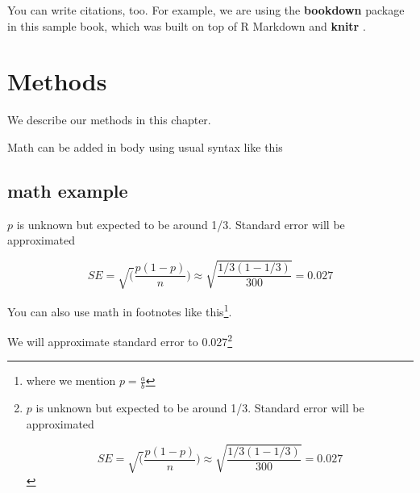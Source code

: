 \documentclass[
]{book}
\begin{document}
You can write citations, too. For example, we are using the \textbf{bookdown} package \citep{R-bookdown} in this sample book, which was built on top of R Markdown and \textbf{knitr} \citep{xie2015}.

\hypertarget{methods}{%
\chapter{Methods}\label{methods}}

We describe our methods in this chapter.

Math can be added in body using usual syntax like this

\hypertarget{math-example}{%
\section{math example}\label{math-example}}

\(p\) is unknown but expected to be around 1/3. Standard error will be approximated

\[
SE = \sqrt(\frac{p(1-p)}{n}) \approx \sqrt{\frac{1/3 (1 - 1/3)} {300}} = 0.027
\]

You can also use math in footnotes like this\footnote{where we mention \(p = \frac{a}{b}\)}.

We will approximate standard error to 0.027\footnote{\(p\) is unknown but expected to be around 1/3. Standard error will be approximated

  \[
  SE = \sqrt(\frac{p(1-p)}{n}) \approx \sqrt{\frac{1/3 (1 - 1/3)} {300}} = 0.027
  \]}

  
\end{document}
